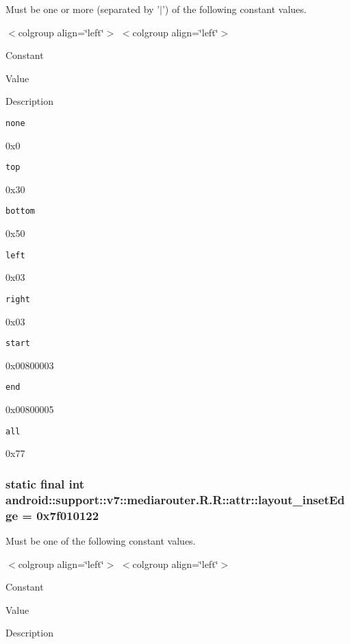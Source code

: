 Must be one or more (separated by '$|$') of the following constant values. \begin{TabularC}{0}
\hline
\end{TabularC}
$<$colgroup align=\char`\"{}left\char`\"{}$>$ $<$colgroup align=\char`\"{}left\char`\"{}$>$ 

Constant

Value

Description 

{\tt none}

0x0

{\tt top}

0x30

{\tt bottom}

0x50

{\tt left}

0x03

{\tt right}

0x03

{\tt start}

0x00800003

{\tt end}

0x00800005

{\tt all}

0x77\hypertarget{classandroid_1_1support_1_1v7_1_1mediarouter_1_1_r_1_1attr_d8110304b35f9662f6578d1418b3a355}{
\subsubsection[{layout\_\-insetEdge}]{\setlength{\rightskip}{0pt plus 5cm}static final int android::support::v7::mediarouter.R.R::attr::layout\_\-insetEdge = 0x7f010122}}
\label{classandroid_1_1support_1_1v7_1_1mediarouter_1_1_r_1_1attr_d8110304b35f9662f6578d1418b3a355}


Must be one of the following constant values. \begin{TabularC}{0}
\hline
\end{TabularC}
$<$colgroup align=\char`\"{}left\char`\"{}$>$ $<$colgroup align=\char`\"{}left\char`\"{}$>$ 

Constant

Value

Description 

